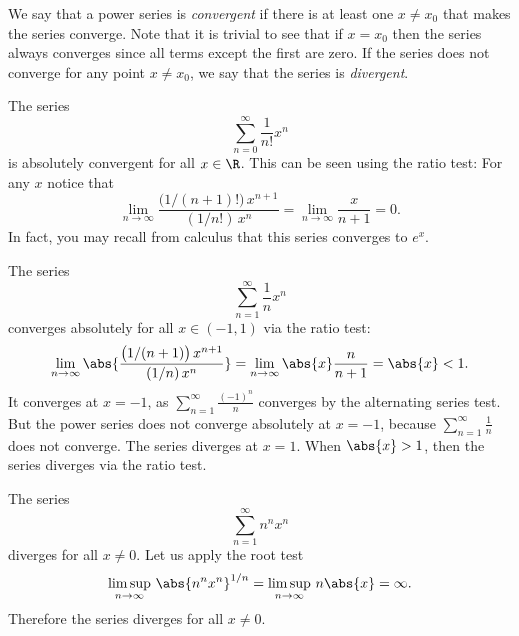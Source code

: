 \documentclass[12pt]{book}
\begin{document}
We say that a power series is
\emph{convergent} if
there is at least one $x \not= x_0$ that makes the series converge.
Note that it is trivial to see that if $x=x_0$ then the series always
converges since all terms except the first are zero.
If the series does not converge for any point $x \not= x_0$, we say that
the series is \emph{divergent}.

\begin{example} \label{ps:expex}
The series
\begin{equation*}
\sum_{n=0}^\infty \frac{1}{n!} x^n
\end{equation*}
is absolutely convergent for all $x \in \R$.
This can be seen using the ratio test:
For any $x$ notice that
\begin{equation*}
\lim_{n \to \infty}
\frac{\bigl(1/(n+1)!\bigr) \, x^{n+1}}{(1/n!) \, x^{n}}
=
\lim_{n \to \infty}
\frac{x}{n+1}
=
0.
\end{equation*}
In fact, you may recall from calculus that this series converges to $e^x$.
\end{example}

\begin{example} \label{ps:1kex}
The series
\begin{equation*}
\sum_{n=1}^\infty \frac{1}{n} x^n
\end{equation*}
converges absolutely for all $x \in (-1,1)$ via the ratio test:
\begin{equation*}
\lim_{n \to \infty}
\abs{
\frac{\bigl(1/(n+1) \bigr) \, x^{n+1}}{(1/n) \, x^{n}}
}
=
\lim_{n \to \infty}
\abs{x} \frac{n}{n+1}
=
\abs{x} < 1 .
\end{equation*}
It converges at $x=-1$,
as
$\sum_{n=1}^\infty \frac{{(-1)}^n}{n}$ converges
by the alternating series
test.
But the power series does not converge absolutely at $x=-1$, because
$\sum_{n=1}^\infty \frac{1}{n}$ does not converge.
The series
diverges at $x=1$.
When $\abs{x} > 1$, then the series diverges via the ratio test.
\end{example}

\begin{example} \label{ps:divergeex}
The series
\begin{equation*}
\sum_{n=1}^\infty n^n x^n
\end{equation*}
diverges for all $x \not= 0$.
Let us apply the root test
\begin{equation*}
\limsup_{n\to\infty}
\,
\abs{n^n x^n}^{1/n}
=
\limsup_{n\to\infty}
\,
n \abs{x}
= \infty .
\end{equation*}
Therefore the series diverges for all $x \not= 0$.
\end{example}
\end{document}
